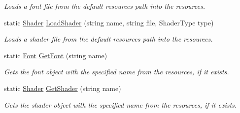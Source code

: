 \begin{DoxyCompactItemize}
\begin{DoxyCompactList}\small\item\em Loads a font file from the default resources path into the resources. \end{DoxyCompactList}\item 
static \hyperlink{class_tri_devs_1_1_tri_engine_1_1_shaders_1_1_shader}{Shader} \hyperlink{class_tri_devs_1_1_tri_engine_1_1_resources_aa51dd74225059aedf36acfd93bbc1a8a}{Load\-Shader} (string name, string file, Shader\-Type type)
\begin{DoxyCompactList}\small\item\em Loads a shader file from the default resources path into the resources. \end{DoxyCompactList}\item 
static \hyperlink{class_tri_devs_1_1_tri_engine_1_1_text_1_1_font}{Font} \hyperlink{class_tri_devs_1_1_tri_engine_1_1_resources_a02ee31e2949d5d3723c757715f9bcf5c}{Get\-Font} (string name)
\begin{DoxyCompactList}\small\item\em Gets the font object with the specified name from the resources, if it exists. \end{DoxyCompactList}\item 
static \hyperlink{class_tri_devs_1_1_tri_engine_1_1_shaders_1_1_shader}{Shader} \hyperlink{class_tri_devs_1_1_tri_engine_1_1_resources_a058557a8b90fde6e4d5a99446b940ca1}{Get\-Shader} (string name)
\begin{DoxyCompactList}\small\item\em Gets the shader object with the specified name from the resources, if it exists. \end{DoxyCompactList}\end{DoxyCompactItemize}
